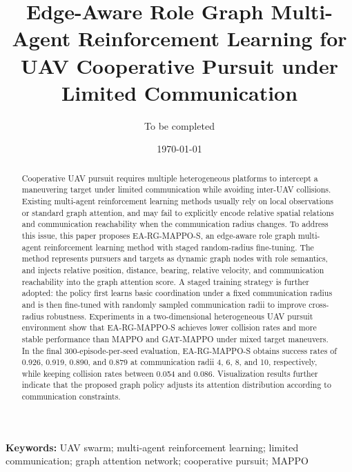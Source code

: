 \documentclass[a4paper,11pt]{article}
\title{Edge-Aware Role Graph Multi-Agent Reinforcement Learning for UAV Cooperative Pursuit under Limited Communication}
\author{To be completed}
\date{\today}
\begin{document}
\maketitle

\begin{abstract}
Cooperative UAV pursuit requires multiple heterogeneous platforms to intercept a maneuvering target under limited communication while avoiding inter-UAV collisions. Existing multi-agent reinforcement learning methods usually rely on local observations or standard graph attention, and may fail to explicitly encode relative spatial relations and communication reachability when the communication radius changes. To address this issue, this paper proposes EA-RG-MAPPO-S, an edge-aware role graph multi-agent reinforcement learning method with staged random-radius fine-tuning. The method represents pursuers and targets as dynamic graph nodes with role semantics, and injects relative position, distance, bearing, relative velocity, and communication reachability into the graph attention score. A staged training strategy is further adopted: the policy first learns basic coordination under a fixed communication radius and is then fine-tuned with randomly sampled communication radii to improve cross-radius robustness. Experiments in a two-dimensional heterogeneous UAV pursuit environment show that EA-RG-MAPPO-S achieves lower collision rates and more stable performance than MAPPO and GAT-MAPPO under mixed target maneuvers. In the final 300-episode-per-seed evaluation, EA-RG-MAPPO-S obtains success rates of 0.926, 0.919, 0.890, and 0.879 at communication radii 4, 6, 8, and 10, respectively, while keeping collision rates between 0.054 and 0.086. Visualization results further indicate that the proposed graph policy adjusts its attention distribution according to communication constraints.
\end{abstract}

\noindent\textbf{Keywords:} UAV swarm; multi-agent reinforcement learning; limited communication; graph attention network; cooperative pursuit; MAPPO












\end{document}
